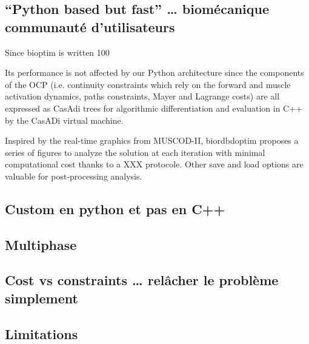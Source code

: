  

\subsection{“Python based but fast” … biomécanique communauté d’utilisateurs}

Since bioptim is written 100%

Its performance is not affected by our Python architecture since the components of the OCP (i.e. continuity constraints which rely on the forward and muscle activation dynamics, paths constraints, Mayer and Lagrange costs) are all expressed as CasAdi trees for algorithmic differentiation and evaluation in C++ by the CasADi virtual machine.  

Inspired by the  real-time graphics from MUSCOD-II, biordbdoptim proposes a series of figures to analyze the solution at each iteration with  minimal computational cost thanks to a XXX protocole. Other save and load options are valuable for post-processing analysis.

\subsection{Custom en python et pas en C++}


\subsection{Multiphase}

\subsection{Cost vs constraints … relâcher le problème simplement}

\subsection{Limitations}


